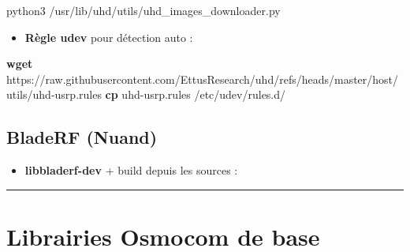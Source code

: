 \documentclass[
  french,
]{article}
\newenvironment{Shaded}{\begin{snugshade}}{\end{snugshade}}
\newcommand{\AttributeTok}[1]{\textcolor[rgb]{0.13,0.29,0.53}{#1}}
\newcommand{\BuiltInTok}[1]{#1}
\newcommand{\ExtensionTok}[1]{#1}
\newcommand{\FunctionTok}[1]{\textcolor[rgb]{0.13,0.29,0.53}{\textbf{#1}}}
\newcommand{\KeywordTok}[1]{\textcolor[rgb]{0.13,0.29,0.53}{\textbf{#1}}}
\newcommand{\NormalTok}[1]{#1}
\newcommand{\VariableTok}[1]{\textcolor[rgb]{0.00,0.00,0.00}{#1}}
\providecommand{\tightlist}{%
  \setlength{\itemsep}{0pt}\setlength{\parskip}{0pt}}
\begin{document}
\begin{Shaded}
\begin{Highlighting}[]
\ExtensionTok{python3}\NormalTok{ /usr/lib/uhd/utils/uhd\_images\_downloader.py}
\end{Highlighting}
\end{Shaded}

\begin{itemize}
\tightlist
\item
  \textbf{Règle udev} pour détection auto :
\end{itemize}

\begin{Shaded}
\begin{Highlighting}[]
\FunctionTok{wget}\NormalTok{ https://raw.githubusercontent.com/EttusResearch/uhd/refs/heads/master/host/utils/uhd{-}usrp.rules}
\FunctionTok{cp}\NormalTok{ uhd{-}usrp.rules /etc/udev/rules.d/}
\end{Highlighting}
\end{Shaded}

\subsection{BladeRF (Nuand)}\label{bladerf-nuand-1}

\begin{itemize}
\tightlist
\item
  \textbf{libbladerf-dev} + build depuis les sources :
\end{itemize}

\begin{Shaded}
\end{Shaded}

\begin{center}\rule{0.5\linewidth}{0.5pt}\end{center}

\section{Librairies Osmocom de base}\label{librairies-osmocom-de-base-1}
\end{document}
